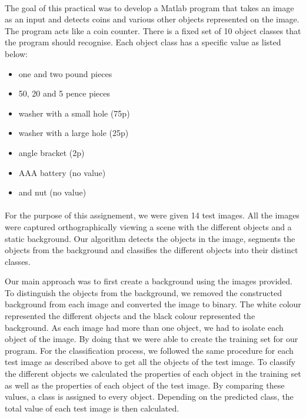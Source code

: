 \documentclass[11pt]{article}
\begin{document}
\paragraph{}
The goal of this practical was to develop a Matlab program that takes an image as an input and detects coins and various other objects represented on the image. The program acts like a coin counter. There is a fixed set of 10 object classes that the program should recognise. Each object class has a specific value as listed below:
 
\begin{itemize}
\item one and two pound pieces 
\item 50, 20 and 5 pence pieces
\item washer with a small hole (75p)
\item washer with a large hole (25p)
\item angle bracket (2p)
\item AAA battery (no value)
\item and nut (no value)
\end{itemize}

\paragraph{}
For the purpose of this assignement, we were given 14 test images. All the images were captured orthographically viewing a scene with the different objects and a static background. Our algorithm detects the objects in the image, segments the objects from the background and classifies the different objects into their distinct classes.

Our main approach was to first create a background using the images provided. To distinguish the objects from the background, we removed the constructed background from each image and converted the image to binary. The white colour represented the different objects and the black colour represented the background. As each image had more than one object, we had to isolate each object of the image. By doing that we were able to create the training set for our program. For the classification process, we followed the same procedure for each test image as described above to get all the objects of the test image. To classify the different objects we calculated the properties of each object in the training set as well as the properties of each object of the test image. By comparing these values, a class is assigned to every object. Depending on the predicted class, the total value of each test image is then calculated.
\newpage
\end{document}
